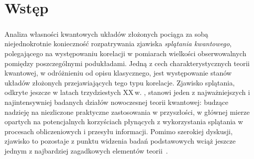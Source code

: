 \chapter*{Wstęp}
\label{chp:intro}

\paragraph{}
\label{par:intro:01}
Analiza własności kwantowych układów złożonych pociąga za sobą niejednokrotnie
konieczność rozpatrywania zjawiska
 \emph{splątania kwantowego},
polegającego na występowaniu korelacji w pomiarach
wielkości obserwowalnych pomiędzy poszczególnymi podukładami.
Jedną z cech charakterystycznych teorii kwantowej,
w odróżnieniu od opisu klasycznego,
jest występowanie stanów układów złożonych przejawiających tego typu korelacje.
Zjawisko splątania, odkryte jeszcze w latach trzydziestych XX\,w.
\cite{einstein1935can,schrodinger1935gegenwartige},
stanowi jeden z najważniejszych i najintensywniej badanych działów nowoczesnej
teorii kwantowej:
budzące nadzieję na niezliczone praktyczne zastosowania w przyszłości,
w głównej mierze opartych na potencjalnych korzyściach płynących
z wykorzystania splątania w procesach obliczeniowych i przesyłu informacji.
Pomimo szerokiej dyskusji,
zjawisko to pozostaje z punktu widzenia badań podstawowych wciąż jeszcze jednym
z najbardziej zagadkowych elementów
\mbox{teorii \cite{horodecki2009quantum}}.

